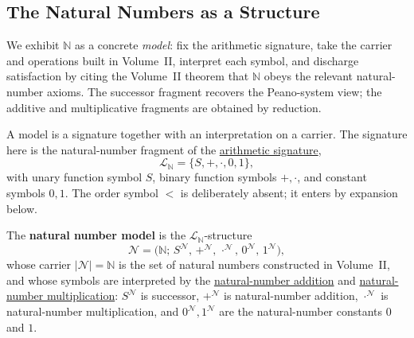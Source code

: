 
\subsection*{The Natural Numbers as a Structure}

\begin{remark*}
We exhibit $\mathbb{N}$ as a concrete \emph{model}: fix the arithmetic
signature, take the carrier and operations built in Volume~II, interpret each
symbol, and discharge satisfaction by citing the Volume~II theorem that
$\mathbb{N}$ obeys the relevant natural-number axioms. The successor fragment
recovers the Peano-system view; the additive and multiplicative fragments are
obtained by reduction.
\end{remark*}

\begin{remark*}[Exposition]
A model is a signature together with an interpretation on a carrier. The
signature here is the natural-number fragment of the
\hyperref[def:arithmetic-signature]{arithmetic signature},
\[
\mathcal{L}_{\mathbb{N}}=\{S,+,\cdot,0,1\},
\]
with unary function symbol $S$, binary function symbols $+,\cdot$, and
constant symbols $0,1$. The order symbol $<$ is deliberately absent; it enters
by expansion below.
\end{remark*}

\begin{definition}
\label{def:natural-number-model}
The \textbf{natural number model} is the $\mathcal{L}_{\mathbb{N}}$-structure
\[
\mathcal{N}
=
\bigl(\mathbb{N};\,
S^{\mathcal{N}},\,+^{\mathcal{N}},\,\cdot^{\mathcal{N}},
\,0^{\mathcal{N}},\,1^{\mathcal{N}}\bigr),
\]
whose carrier $|\mathcal{N}|=\mathbb{N}$ is the set of natural numbers
constructed in Volume~II, and whose symbols are interpreted by the
\hyperref[def:addition-on-peano-system]{natural-number addition} and
\hyperref[def:multiplication-on-peano-system]{natural-number multiplication}:
$S^{\mathcal{N}}$ is successor, $+^{\mathcal{N}}$ is natural-number addition,
$\cdot^{\mathcal{N}}$ is natural-number multiplication, and
$0^{\mathcal{N}},1^{\mathcal{N}}$ are the natural-number constants $0$ and $1$.
\end{definition}

